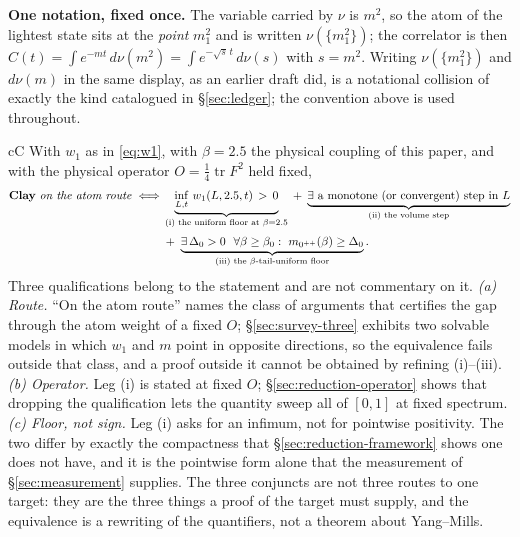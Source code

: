 \smallskip
\noindent\textbf{One notation, fixed once.} The variable carried by $\nu$ is $m^2$, so the atom of
the lightest state sits at the \emph{point} $m_1^2$ and is written $\nu(\{m_1^2\})$; the correlator
is then $C(t)=\int e^{-mt}\,d\nu(m^2)=\int e^{-\sqrt{s}\,t}\,d\nu(s)$ with $s=m^2$. Writing
$\nu(\{m_1^2\})$ and $d\nu(m)$ in the same display, as an earlier draft did, is a notational
collision of exactly the kind catalogued in \S\ref{sec:ledger}; the convention above is used
throughout.

\begin{claimbox}{cC}
 With $w_1$ as in \eqref{eq:w1}, with $\beta=2.5$ the physical coupling of
this paper, and with the physical operator $O=\tfrac14\operatorname{tr}F^2$ held fixed,
\begin{align*}
  \textbf{Clay}\ \text{\emph{on the atom route}}\;\Longleftrightarrow\;&
  \underbrace{\inf_{L,t}\, w_1(L,2.5,t) \,>\, 0}_{\text{(i) the uniform floor at }\beta=2.5}
  \;+\;\underbrace{\exists\ \text{a monotone (or convergent) step in } L}_{\text{(ii) the volume step}}\\[2pt]
  &+\;\underbrace{\exists\,\Delta_0>0\ \ \forall \beta\ge\beta_0:\ m_{0^{++}}(\beta)\ge\Delta_0}_{\text{(iii) the }\beta\text{-tail-uniform floor}} .
\end{align*}
Three qualifications belong to the statement and are not commentary on it.
\emph{(a) Route.} ``On the atom route'' names the class of arguments that certifies the gap through
the atom weight of a fixed $O$; \S\ref{sec:survey-three} exhibits two solvable models in which $w_1$
and $m$ point in opposite directions, so the equivalence fails outside that class, and a proof
outside it cannot be obtained by refining (i)--(iii).
\emph{(b) Operator.} Leg (i) is stated at fixed $O$; \S\ref{sec:reduction-operator} shows that
dropping the qualification lets the quantity sweep all of $[0,1]$ at fixed spectrum.
\emph{(c) Floor, not sign.} Leg (i) asks for an infimum, not for pointwise positivity. The two differ
by exactly the compactness that \S\ref{sec:reduction-framework} shows one does not have, and it is
the pointwise form alone that the measurement of \S\ref{sec:measurement} supplies. The three
conjuncts are not three routes to one target: they are the three things a proof of the target must
supply, and the equivalence is a rewriting of the quantifiers, not a theorem about Yang--Mills.
\end{claimbox}

